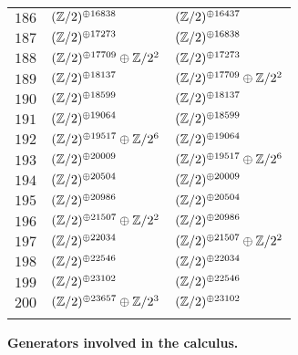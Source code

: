 \begin{supertabular}{|c|p{5.5cm}|p{5.5cm}|}
$186$%
&$(\mathbb{Z}/2)^{\oplus16838}$%
&$(\mathbb{Z}/2)^{\oplus16437}$\\

$187$%
&$(\mathbb{Z}/2)^{\oplus17273}$%
&$(\mathbb{Z}/2)^{\oplus16838}$\\

$188$%
&$(\mathbb{Z}/2)^{\oplus17709}\oplus\mathbb{Z}/2^{2}$%
&$(\mathbb{Z}/2)^{\oplus17273}$\\

$189$%
&$(\mathbb{Z}/2)^{\oplus18137}$%
&$(\mathbb{Z}/2)^{\oplus17709}\oplus\mathbb{Z}/2^{2}$\\

$190$%
&$(\mathbb{Z}/2)^{\oplus18599}$%
&$(\mathbb{Z}/2)^{\oplus18137}$\\

$191$%
&$(\mathbb{Z}/2)^{\oplus19064}$%
&$(\mathbb{Z}/2)^{\oplus18599}$\\

$192$%
&$(\mathbb{Z}/2)^{\oplus19517}\oplus\mathbb{Z}/2^{6}$%
&$(\mathbb{Z}/2)^{\oplus19064}$\\

$193$%
&$(\mathbb{Z}/2)^{\oplus20009}$%
&$(\mathbb{Z}/2)^{\oplus19517}\oplus\mathbb{Z}/2^{6}$\\

$194$%
&$(\mathbb{Z}/2)^{\oplus20504}$%
&$(\mathbb{Z}/2)^{\oplus20009}$\\

$195$%
&$(\mathbb{Z}/2)^{\oplus20986}$%
&$(\mathbb{Z}/2)^{\oplus20504}$\\

$196$%
&$(\mathbb{Z}/2)^{\oplus21507}\oplus\mathbb{Z}/2^{2}$%
&$(\mathbb{Z}/2)^{\oplus20986}$\\

$197$%
&$(\mathbb{Z}/2)^{\oplus22034}$%
&$(\mathbb{Z}/2)^{\oplus21507}\oplus\mathbb{Z}/2^{2}$\\

$198$%
&$(\mathbb{Z}/2)^{\oplus22546}$%
&$(\mathbb{Z}/2)^{\oplus22034}$\\

$199$%
&$(\mathbb{Z}/2)^{\oplus23102}$%
&$(\mathbb{Z}/2)^{\oplus22546}$\\

$200$%
&$(\mathbb{Z}/2)^{\oplus23657}\oplus\mathbb{Z}/2^{3}$%
&$(\mathbb{Z}/2)^{\oplus23102}$\\

&&\\\end{supertabular}
\newpage
{\bf Generators involved in the calculus.\\}


